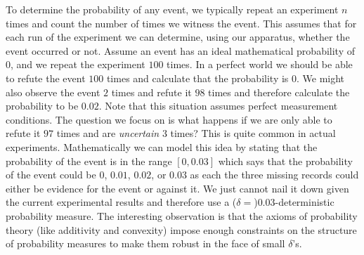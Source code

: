 \documentclass[english,reprint, aps, prl,superscriptaddress, showpacs,
showkeys, longbibliography, amsmath, amssymb, floatfix]{revtex4-1}
\theoremstyle{plain}
\theoremstyle{definition}
\begin{document}
To determine the probability of any event,
we typically repeat an experiment $n$ times and count the number
of times we witness the event. This assumes that for each run of the
experiment we can determine, using our apparatus, whether the event
occurred or not. Assume an event has an ideal mathematical probability
of $0$, and we repeat the experiment $100$ times. In a perfect world
we should be able to refute the event $100$ times and calculate that
the probability is $0$. We might also observe the event $2$ times
and refute it $98$ times and therefore calculate the probability
to be $0.02$. Note that this situation assumes perfect measurement
conditions.
The question we focus on is what happens if we are only able to refute
it $97$ times and are \emph{uncertain} $3$ times? This is quite
common in actual experiments. Mathematically we can model this idea
by stating that the probability of the event is in the range $\left[0,0.03\right]$
which says that the probability of the event could be $0$, $0.01$,
$0.02$, or $0.03$ as each the three missing records could either
be evidence for the event or against it. We just cannot nail it down
given the current experimental results and therefore use a ($\delta=$)$0.03$-deterministic
probability measure. The interesting observation is that the axioms
of probability theory (like additivity and convexity) impose enough
constraints on the structure of probability measures to make them
robust in the face of small $\delta$'s.
\end{document}
